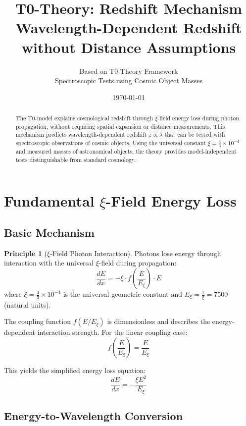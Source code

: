 \documentclass[12pt,a4paper]{article}
\title{\Huge\textbf{T0-Theory: Redshift Mechanism}\\
	\Large Wavelength-Dependent Redshift \\
	without Distance Assumptions}
\author{Based on T0-Theory Framework\\
	Spectroscopic Tests using Cosmic Object Masses}
\date{\today}
\newcommand{\xiconst}{\xi = \frac{4}{3} \times 10^{-4}}
\newcommand{\Exi}{E_\xi}
\theoremstyle{definition}
\newtheorem{principle}{Principle}
\begin{document}
	
	\maketitle
	
	\begin{abstract}
		The T0-model explains cosmological redshift through $\xi$-field energy loss during photon propagation, without requiring spatial expansion or distance measurements. This mechanism predicts wavelength-dependent redshift $z \propto \lambda$ that can be tested with spectroscopic observations of cosmic objects. Using the universal constant $\xiconst$ and measured masses of astronomical objects, the theory provides model-independent tests distinguishable from standard cosmology.
	\end{abstract}
	
	\tableofcontents
	\newpage
	
	\section{Fundamental $\xi$-Field Energy Loss}
	
	\subsection{Basic Mechanism}
	
	\begin{principle}[$\xi$-Field Photon Interaction]
		Photons lose energy through interaction with the universal $\xi$-field during propagation:
		\begin{equation}
			\frac{dE}{dx} = -\xi \cdot f\left(\frac{E}{\Exi}\right) \cdot E
		\end{equation}
		where $\xiconst$ is the universal geometric constant and $\Exi = \frac{1}{\xi} = 7500$ (natural units).
	\end{principle}
	
	The coupling function $f(E/\Exi)$ is dimensionless and describes the energy-dependent interaction strength. For the linear coupling case:
	\begin{equation}
		f\left(\frac{E}{\Exi}\right) = \frac{E}{\Exi}
	\end{equation}
	
	This yields the simplified energy loss equation:
	\begin{equation}
		\frac{dE}{dx} = -\frac{\xi E^2}{\Exi}
	\end{equation}
	
	\subsection{Energy-to-Wavelength Conversion}
	
\end{document}
